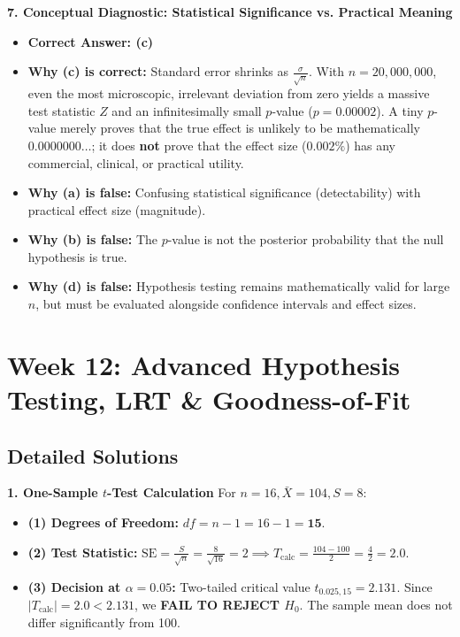\textbf{7. Conceptual Diagnostic: Statistical Significance vs. Practical Meaning}
\begin{itemize}
    \item \textbf{Correct Answer: (c)}
    \item \textbf{Why (c) is correct:} Standard error shrinks as $\frac{\sigma}{\sqrt{n}}$. With $n = 20,000,000$, even the most microscopic, irrelevant deviation from zero yields a massive test statistic $Z$ and an infinitesimally small $p$-value ($p = 0.00002$). 
    A tiny $p$-value merely proves that the true effect is unlikely to be mathematically $0.0000000\dots$; it does \textbf{not} prove that the effect size ($0.002\%$) has any commercial, clinical, or practical utility.
    \item \textbf{Why (a) is false:} Confusing statistical significance (detectability) with practical effect size (magnitude).
    \item \textbf{Why (b) is false:} The $p$-value is not the posterior probability that the null hypothesis is true.
    \item \textbf{Why (d) is false:} Hypothesis testing remains mathematically valid for large $n$, but must be evaluated alongside confidence intervals and effect sizes.
\end{itemize}

\section*{Week 12: Advanced Hypothesis Testing, LRT \& Goodness-of-Fit}

\subsection*{Detailed Solutions}

\textbf{1. One-Sample $t$-Test Calculation}
For $n = 16, \bar{X} = 104, S = 8$:
\begin{itemize}
    \item \textbf{(1) Degrees of Freedom:} $df = n - 1 = 16 - 1 = \mathbf{15}$.
    \item \textbf{(2) Test Statistic:} $\text{SE} = \frac{S}{\sqrt{n}} = \frac{8}{\sqrt{16}} = 2 \implies T_{\text{calc}} = \frac{104 - 100}{2} = \frac{4}{2} = \mathbf{2.0}$.
    \item \textbf{(3) Decision at $\alpha = 0.05$:} Two-tailed critical value $t_{0.025, 15} = 2.131$.
    Since $|T_{\text{calc}}| = 2.0 < 2.131$, we \textbf{FAIL TO REJECT $H_0$}. The sample mean does not differ significantly from 100.
\end{itemize}

